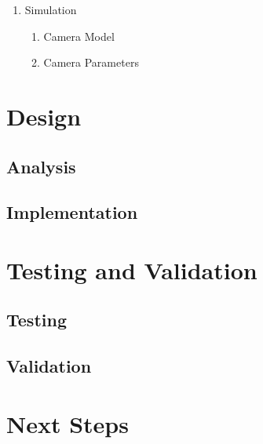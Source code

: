 \documentclass[11pt]{report}
\begin{document}
\begin{enumerate}
\item Simulation
\begin{enumerate}
	\item Camera Model
	\item Camera Parameters 
\end{enumerate}
\end{enumerate}

\chapter{Design}

\section{Analysis}

\section{Implementation}

\chapter{Testing and Validation}

\section{Testing}

\section{Validation}

\chapter{Next Steps}
\end{document}
